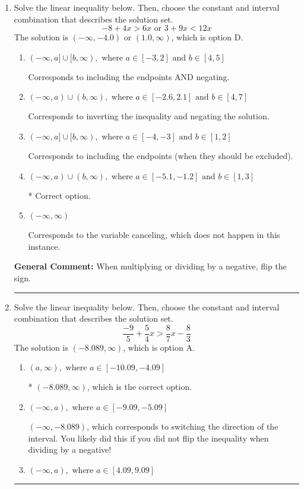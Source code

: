 \documentclass{extbook}[14pt]
\newcommand{\litem}[1]{\item #1

\rule{\textwidth}{0.4pt}}
\begin{document}
\begin{enumerate}\litem{
Solve the linear inequality below. Then, choose the constant and interval combination that describes the solution set.
\[ -8 + 4 x > 6 x \text{ or } 3 + 9 x < 12 x \]The solution is \( (-\infty, -4.0) \text{ or } (1.0, \infty) \), which is option D.\begin{enumerate}[label=\Alph*.]
\item \( (-\infty, a] \cup [b, \infty), \text{ where } a \in [-3, 2] \text{ and } b \in [4, 5] \)

Corresponds to including the endpoints AND negating.
\item \( (-\infty, a) \cup (b, \infty), \text{ where } a \in [-2.6, 2.1] \text{ and } b \in [4, 7] \)

Corresponds to inverting the inequality and negating the solution.
\item \( (-\infty, a] \cup [b, \infty), \text{ where } a \in [-4, -3] \text{ and } b \in [1, 2] \)

Corresponds to including the endpoints (when they should be excluded).
\item \( (-\infty, a) \cup (b, \infty), \text{ where } a \in [-5.1, -1.2] \text{ and } b \in [1, 3] \)

 * Correct option.
\item \( (-\infty, \infty) \)

Corresponds to the variable canceling, which does not happen in this instance.
\end{enumerate}

\textbf{General Comment:} When multiplying or dividing by a negative, flip the sign.
}
\litem{
Solve the linear inequality below. Then, choose the constant and interval combination that describes the solution set.
\[ \frac{-9}{5} + \frac{5}{4} x > \frac{8}{7} x - \frac{8}{3} \]The solution is \( (-8.089, \infty) \), which is option A.\begin{enumerate}[label=\Alph*.]
\item \( (a, \infty), \text{ where } a \in [-10.09, -4.09] \)

* $(-8.089, \infty)$, which is the correct option.
\item \( (-\infty, a), \text{ where } a \in [-9.09, -5.09] \)

 $(-\infty, -8.089)$, which corresponds to switching the direction of the interval. You likely did this if you did not flip the inequality when dividing by a negative!
\item \( (-\infty, a), \text{ where } a \in [4.09, 9.09] \)


\end{enumerate}}
\end{enumerate}
\end{document}
